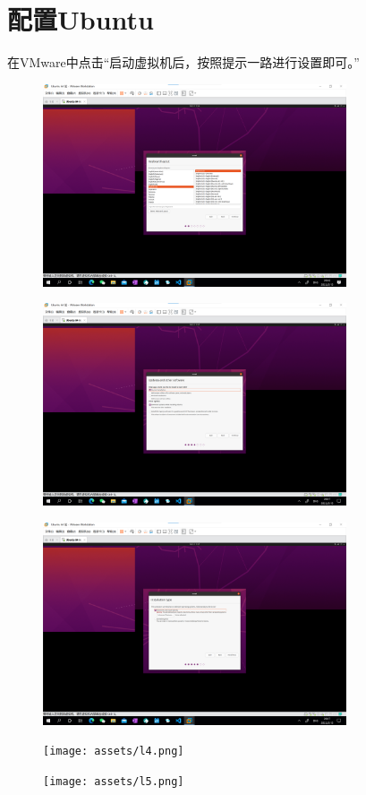 \documentclass[UTF8]{ctexart}
\begin{document}
    \section{配置Ubuntu}
    在VMware中点击“启动虚拟机后，按照提示一路进行设置即可。”
    \begin{figure}[H]
        \centering
        \includegraphics[width=0.8\textwidth]{assets/l1.png}
    \end{figure}
    \begin{figure}[H]
        \centering
        \includegraphics[width=0.8\textwidth]{assets/l2.png}
    \end{figure}   
    \begin{figure}[H]
        \centering
        \includegraphics[width=0.8\textwidth]{assets/l3.png}
    \end{figure}
    \begin{figure}[H]
        \centering
        \texttt{[image: assets/l4.png]}
    \end{figure}
    \begin{figure}[H]
        \centering
        \texttt{[image: assets/l5.png]}
    \end{figure}
\end{document}
